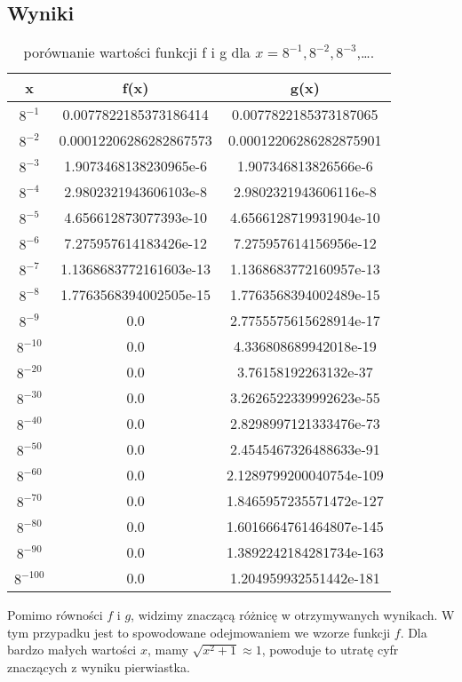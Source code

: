 \documentclass{article}
\begin{document}
\begin{center}
    \subsection{Wyniki}
    \begin{table}[h!]
        \centering
        \begin{tabular}{||c c c||} 
        \hline
        \textbf{x} & \textbf{f(x)} & \textbf{g(x)}  \\ [0.5ex]
        \hline\hline
         \(8^{-1}\) & 0.0077822185373186414 & 0.0077822185373187065 \\ 
         \(8^{-2}\) & 0.00012206286282867573  & 0.00012206286282875901 \\
         \(8^{-3}\) & 1.9073468138230965e-6 & 1.907346813826566e-6 \\ 
         \(8^{-4}\) & 2.9802321943606103e-8  & 2.9802321943606116e-8 \\ 
         \(8^{-5}\) & 4.656612873077393e-10  & 4.6566128719931904e-10 \\ 
         \(8^{-6}\) & 7.275957614183426e-12  & 7.275957614156956e-12 \\ 
         \(8^{-7}\) & 1.1368683772161603e-13 &  1.1368683772160957e-13 \\ 
         \(8^{-8}\) & 1.7763568394002505e-15 & 1.7763568394002489e-15 \\ 
         \(8^{-9}\) & 0.0 & 2.7755575615628914e-17 \\ 
         \(8^{-10}\) & 0.0 & 4.336808689942018e-19 \\ 
         \(8^{-20}\) & 0.0 & 3.76158192263132e-37 \\ 
         \(8^{-30}\) & 0.0 & 3.2626522339992623e-55 \\ 
         \(8^{-40}\) & 0.0 & 2.8298997121333476e-73 \\ 
         \(8^{-50}\) & 0.0 & 2.4545467326488633e-91 \\ 
         \(8^{-60}\) & 0.0 & 2.1289799200040754e-109 \\ 
         \(8^{-70}\) & 0.0 & 1.8465957235571472e-127 \\ 
         \(8^{-80}\) & 0.0 & 1.6016664761464807e-145 \\ 
         \(8^{-90}\) & 0.0 & 1.3892242184281734e-163 \\ 
         \(8^{-100}\) & 0.0 & 1.204959932551442e-181 \\ 
        \hline
        \end{tabular}
        \caption{porównanie wartości funkcji f i g dla \(x = 8^{-1},8^{-2},8^{-3}\),\ldots.}
        \label{table:12}
        \end{table}
        Pomimo równości \(f\) i \(g\), widzimy znaczącą różnicę w otrzymywanych wynikach.
        W tym przypadku jest to spowodowane odejmowaniem we wzorze funkcji \(f\).
        Dla bardzo małych wartości \(x\), mamy \(\textstyle \sqrt{x^2 + 1} \approx 1\), powoduje to utratę cyfr znaczących z wyniku pierwiastka.

\end{center}
\end{document}
